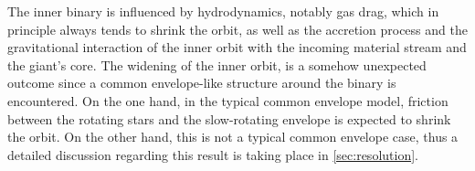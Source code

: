 The inner binary is influenced by hydrodynamics, notably gas drag, which in principle always tends to shrink the orbit, as well as the accretion process and the gravitational interaction of the inner orbit with the incoming material stream and the giant's core. The widening of the inner orbit, is a somehow unexpected outcome since a common envelope-like structure around the binary is encountered. On the one hand, in the typical common envelope model, friction between the rotating stars and the slow-rotating envelope is expected to shrink the orbit. On the other hand, this is not a typical common envelope case, thus a detailed discussion regarding this result is taking place in \cref{sec:resolution}. 

